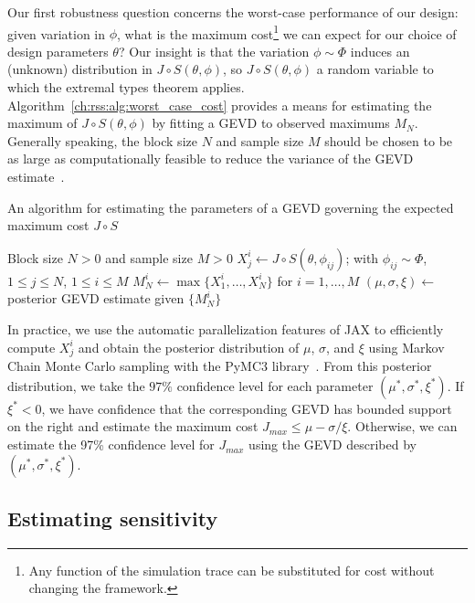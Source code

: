 Our first robustness question concerns the worst-case performance of our design: given variation in $\phi$, what is the maximum cost\footnote{Any function of the simulation trace can be substituted for cost without changing the framework.} we can expect for our choice of design parameters $\theta$? Our insight is that the variation $\phi \sim \Phi$ induces an (unknown) distribution in $J \circ S (\theta, \phi)$, so $J \circ S (\theta, \phi)$ a random variable to which the extremal types theorem applies. Algorithm~\ref{ch:rss:alg:worst_case_cost} provides a means for estimating the maximum of $J \circ S (\theta, \phi)$ by fitting a GEVD to observed maximums $M_N$. Generally speaking, the block size $N$ and sample size $M$ should be chosen to be as large as computationally feasible to reduce the variance of the GEVD estimate~\cite{coles_2001}.

\begin{algorithm}
    \caption{An algorithm for estimating the parameters of a GEVD governing the expected maximum cost $J \circ S$}\label{ch:rss:alg:worst_case_cost}
    \begin{algorithmic}
        \Require Block size $N > 0$ and sample size $M > 0$
        \State $X_j^i \gets J\circ S(\theta, \phi_{ij})$; with $\phi_{ij}\sim\Phi$, $1\leq j\leq N$, $1\leq i\leq M$
        \State $M_N^i \gets \max\{X_1^i, \ldots, X_N^i\}$ for $i=1,\ldots,M$
        \State $(\mu, \sigma, \xi) \gets$ posterior GEVD estimate given $\{M_N^i\}$
    \end{algorithmic}
\end{algorithm}

In practice, we use the automatic parallelization features of JAX to efficiently compute $X_j^i$ and obtain the posterior distribution of $\mu$, $\sigma$, and $\xi$ using Markov Chain Monte Carlo sampling with the PyMC3 library~\cite{salvatier_wiecki_fonnesbeck_2016}. From this posterior distribution, we take the $97\%$ confidence level for each parameter $(\mu^*, \sigma^*, \xi^*)$. If $\xi^* < 0$, we have confidence that the corresponding GEVD has bounded support on the right and estimate the maximum cost $J_{max} \leq \mu - \sigma/\xi$. Otherwise, we can estimate the 97\% confidence level for $J_{max}$ using the GEVD described by $(\mu^*, \sigma^*, \xi^*)$.

\subsection{Estimating sensitivity}

